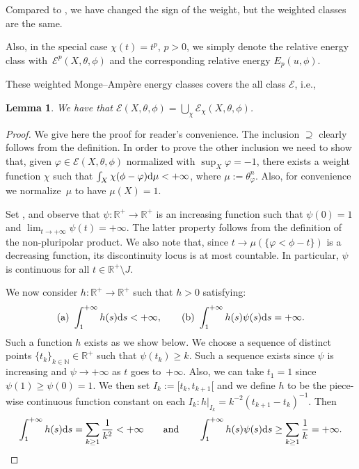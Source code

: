 \documentclass[pdftex]{sigma}
\numberwithin{equation}{section}
\newtheorem{Lemma}[Theorem]{Lemma}
\theoremstyle{plain}
\newcommand{\R}{\mathbb R}
\newcommand{\N}{\mathbb N}
\begin{document}
Compared to \cite{GZ07}, we have changed the sign of the weight, but the weighted classes are the same.

Also, in the special case $\chi(t)=t^p$, $p>0$, we simply denote the relative energy class with~${\mathcal{E}^p(X,\theta,\phi)}$
and the corresponding relative energy $E_p(u,\phi)$.

These weighted Monge--Amp\`ere energy classes covers the all class $\mathcal{E}$, i.e.,

\begin{Lemma}\label{energy union} We have that
$\mathcal{E}(X,\theta,\phi)=\bigcup_{\chi}\mathcal{E}_\chi(X,\theta,\phi)$.
\end{Lemma}

\begin{proof}We give here the proof for reader's convenience.
The inclusion $ \supseteq $ clearly follows from the definition. In order to prove the other inclusion we need to show that, given $\varphi \in \mathcal{E}(X,\theta,\phi)$ normalized with $\sup_X \varphi =-1$, there exists a weight function $\chi$ such that $\int_X \chi (\phi-\varphi) {\rm d}\mu < +\infty$, where $\mu:=\theta_\varphi^n$. Also, for convenience we normalize~$\mu$ to have $\mu(X)=1$.

Set , and observe that $\psi\colon\R^+\rightarrow \R^+$ is an increasing function such that $\psi(0)=1$ and $\lim_{t\rightarrow +\infty} \psi(t) =+\infty$. The latter property follows from the definition of the non-pluripolar product. We also note that, since $t\rightarrow \mu(\{\varphi <\phi -t\})$ is a decreasing function, its discontinuity locus is at most countable. In particular, $\psi$ is continuous for all $t\in \R^+\setminus J$.

We now consider $h\colon \R^+\rightarrow \R^+$ such that $h> 0$ satisfying:
\[{\rm (a)} \ \int_1^{+\infty} h(s) {\rm d}s <+\infty, \qquad {\rm (b)} \ \int_1^{+\infty} {h(s)} \psi(s) {\rm d}s =+\infty.\]
 Such a function $h$ exists as we show below. We choose a sequence of distinct points $\{t_k\}_{k\in \N}\in \R^+$ such that $\psi(t_k) \geq k$. Such a sequence exists since $\psi$ is increasing and $\psi\rightarrow +\infty $ as $t$ goes to~$+\infty$. Also, we can take $t_1=1$ since $\psi(1)\geq \psi(0)=1$. We then set $I_k:=[t_{k}, t_{k+1}[$ and we define $h$ to be the piece-wise continuous function constant on each $I_k\colon h|_{I_k}= k^{-2} (t_{k+1}-t_k)^{-1} $. Then
 \[\int_1^{+\infty} h(s) {\rm d}s= \sum_{k\geq 1} \frac{1}{k^2} <+\infty \qquad \text{and}\qquad \int_1^{+\infty}h(s)\psi(s) {\rm d}s\geq \sum_{k\geq 1}\frac{1}{k} =+\infty.\]


\end{proof}
\end{document}
